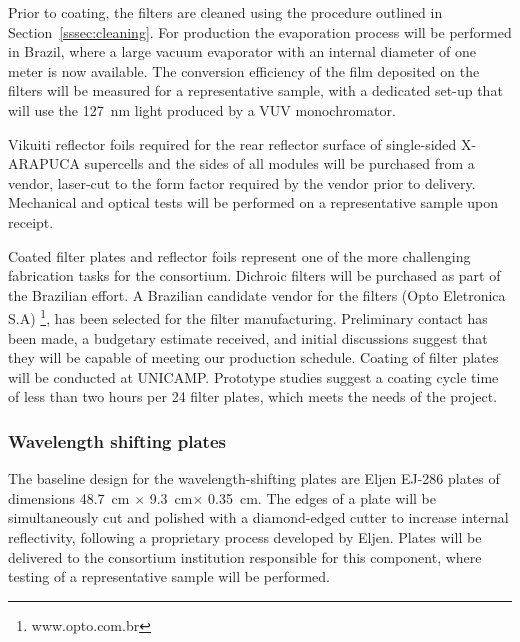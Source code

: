Prior to coating, the filters are cleaned using the procedure outlined in Section~\ref{sssec:cleaning}.
For  production the evaporation process will be performed
in Brazil, 
where a large vacuum evaporator with an internal diameter of one meter is now available. The conversion efficiency of the film deposited on the filters will be measured for a representative sample, with a dedicated set-up that will use the \SI{127}{nm} light produced by a VUV monochromator.

Vikuiti reflector foils required for the rear reflector surface of single-sided X-ARAPUCA supercells and the sides of all modules will be purchased from a vendor, laser-cut to the form factor required by the vendor prior to delivery.  Mechanical and optical  tests will be performed on a representative sample upon receipt.


Coated filter plates and reflector foils represent one of the more challenging fabrication tasks for the consortium.   Dichroic filters will be purchased as part of the Brazilian effort.  A Brazilian candidate vendor for the filters (Opto Eletronica S.A) \footnote{www.opto.com.br}, has been selected for the filter manufacturing.  Preliminary contact has been made, a budgetary estimate received, and initial discussions suggest that they will be capable of meeting our production schedule.  Coating of filter plates will be conducted at UNICAMP.  Prototype studies suggest a coating cycle time of less than two hours per \num{24} filter plates, which meets the needs of the project.

\subsubsection{Wavelength shifting plates}

The baseline design for the wavelength-shifting plates are %
Eljen EJ-286 plates of dimensions \SI{48.7}{cm} $\times$ \SI{9.3}{cm}$\times$ \SI{0.35}{cm}.  The edges of a plate will be simultaneously cut and polished with a diamond-edged cutter to increase internal reflectivity, following a proprietary process developed by Eljen.  Plates will be delivered to the consortium institution responsible for this component, where  testing of a representative sample will be performed.

